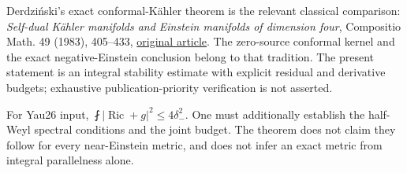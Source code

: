 \documentclass[
  11pt,
]{article}
\begin{document}
Derdziński's exact conformal-Kähler theorem is the relevant classical
comparison: \emph{Self-dual Kähler manifolds and Einstein manifolds of
dimension four}, Compositio Math. 49 (1983), 405--433,
\href{https://www.numdam.org/article/CM_1983__49_3_405_0.pdf}{original
article}. The zero-source conformal kernel and the exact
negative-Einstein conclusion belong to that tradition. The present
statement is an integral stability estimate with explicit residual and
derivative budgets; exhaustive publication-priority verification is not
asserted.

For Yau26 input, \(\fint|\operatorname{Ric}+g|^2\le4\delta_-^2\). One
must additionally establish the half-Weyl spectral conditions and the
joint budget. The theorem does not claim they follow for every
near-Einstein metric, and does not infer an exact metric from integral
parallelness alone.
\end{document}
